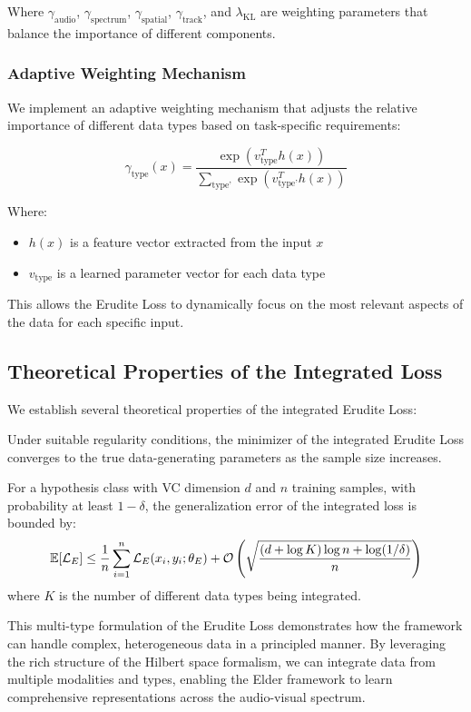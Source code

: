 Where $\gamma_{\text{audio}}$, $\gamma_{\text{spectrum}}$, $\gamma_{\text{spatial}}$, $\gamma_{\text{track}}$, and $\lambda_{\text{KL}}$ are weighting parameters that balance the importance of different components.

\subsubsection{Adaptive Weighting Mechanism}

We implement an adaptive weighting mechanism that adjusts the relative importance of different data types based on task-specific requirements:

\begin{equation}
\gamma_{\text{type}}(x) = \frac{\exp(v_{\text{type}}^T h(x))}{\sum_{\text{type'}} \exp(v_{\text{type'}}^T h(x))}
\end{equation}

Where:
\begin{itemize}
\item $h(x)$ is a feature vector extracted from the input $x$
\item $v_{\text{type}}$ is a learned parameter vector for each data type
\end{itemize}

This allows the Erudite Loss to dynamically focus on the most relevant aspects of the data for each specific input.

\subsection{Theoretical Properties of the Integrated Loss}

We establish several theoretical properties of the integrated Erudite Loss:

\begin{theorem}
Under suitable regularity conditions, the minimizer of the integrated Erudite Loss converges to the true data-generating parameters as the sample size increases.
\end{theorem}

\begin{theorem}
For a hypothesis class with VC dimension $d$ and $n$ training samples, with probability at least $1-\delta$, the generalization error of the integrated loss is bounded by:
\begin{equation}
\mathbb{E}[\mathcal{L}_E] \leq \frac{1}{n}\sum_{i=1}^n \mathcal{L}_E(x_i, y_i; \theta_E) + \mathcal{O}\left(\sqrt{\frac{(d + \log K) \log n + \log(1/\delta)}{n}}\right)
\end{equation}
where $K$ is the number of different data types being integrated.
\end{theorem}

This multi-type formulation of the Erudite Loss demonstrates how the framework can handle complex, heterogeneous data in a principled manner. By leveraging the rich structure of the Hilbert space formalism, we can integrate data from multiple modalities and types, enabling the Elder framework to learn comprehensive representations across the audio-visual spectrum.